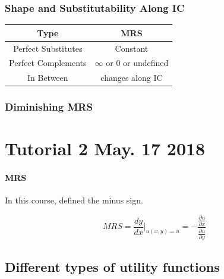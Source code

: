\documentclass{article}
\begin{document}
\subsubsection{Shape and Substitutability Along IC}
\begin{center}
	\begin{tabular}{|c|c|}
		\hline
		Type & MRS \\
		\hline
		Perfect Substitutes & Constant \\
		\hline
		Perfect Complements & $\infty$ or $0$ or undefined \\
		\hline
		In Between & changes along IC \\
		\hline
	\end{tabular}
\end{center}

\subsubsection{Diminishing MRS}


\section{Tutorial 2 May. 17 2018}

\paragraph{MRS} In this course, defined  the minus sign.

\[
	MRS = \frac{dy}{dx}\vert_{u(x,y) = \overline{u}} = - \frac{\frac{\partial u}{\partial x}}{\frac{\partial u}{\partial y}}
\]

\subsection{Different types of utility functions}
\end{document}
